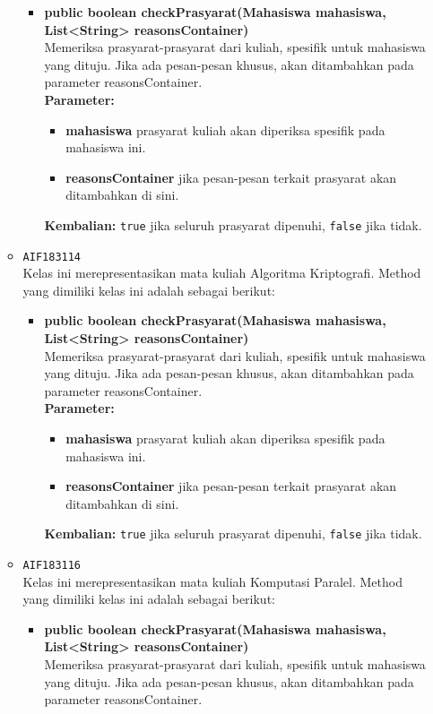\begin{enumerate}
\begin{itemize}
\begin{itemize}
\item \textbf{public boolean checkPrasyarat(Mahasiswa mahasiswa, List<String> reasonsContainer)}\\
Memeriksa prasyarat-prasyarat dari kuliah, spesifik untuk mahasiswa yang dituju. Jika ada pesan-pesan khusus, akan ditambahkan pada parameter reasonsContainer.\\
\textbf{Parameter:}
\begin{itemize}
\item \textbf{mahasiswa} prasyarat kuliah akan diperiksa spesifik pada mahasiswa ini.
\item \textbf{reasonsContainer} jika pesan-pesan terkait prasyarat akan ditambahkan di sini.
\end{itemize}
\textbf{Kembalian:} \texttt{true} jika seluruh prasyarat dipenuhi, \texttt{false} jika tidak.
\end{itemize}
\item \texttt{AIF183114} \\
Kelas ini merepresentasikan mata kuliah Algoritma Kriptografi. Method yang dimiliki kelas ini adalah sebagai berikut: 
\begin{itemize}
\item \textbf{public boolean checkPrasyarat(Mahasiswa mahasiswa, List<String> reasonsContainer)}\\
Memeriksa prasyarat-prasyarat dari kuliah, spesifik untuk mahasiswa yang dituju. Jika ada pesan-pesan khusus, akan ditambahkan pada parameter reasonsContainer.\\
\textbf{Parameter:}
\begin{itemize}
\item \textbf{mahasiswa} prasyarat kuliah akan diperiksa spesifik pada mahasiswa ini.
\item \textbf{reasonsContainer} jika pesan-pesan terkait prasyarat akan ditambahkan di sini.
\end{itemize}
\textbf{Kembalian:} \texttt{true} jika seluruh prasyarat dipenuhi, \texttt{false} jika tidak.
\end{itemize}
\item \texttt{AIF183116} \\
Kelas ini merepresentasikan mata kuliah Komputasi Paralel. Method yang dimiliki kelas ini adalah sebagai berikut: 
\begin{itemize}
\item \textbf{public boolean checkPrasyarat(Mahasiswa mahasiswa, List<String> reasonsContainer)}\\
Memeriksa prasyarat-prasyarat dari kuliah, spesifik untuk mahasiswa yang dituju. Jika ada pesan-pesan khusus, akan ditambahkan pada parameter reasonsContainer.\\

\end{itemize}
\end{itemize}
\end{enumerate}
